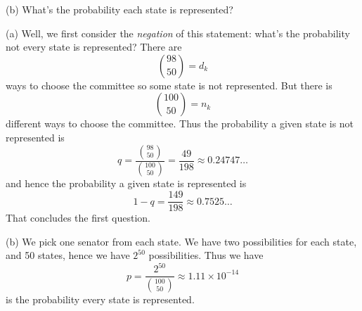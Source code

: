 (b) What's the probability each state is represented?

(a) Well, we first consider the \emph{negation} of this statement: what's
the probability not every state is represented? There are
\begin{equation}
{98\choose 50} = d_{k}
\end{equation}
ways to choose the committee so some state is not represented. But there
is 
\begin{equation}
{100\choose 50}=n_{k}
\end{equation}
different ways to choose the committee. Thus the probability a given state is
not represented is
\begin{equation}
q = \frac{{98\choose50}}{{100\choose50}} = \frac{49}{198}\approx 0.24747\dots
\end{equation}
and hence the probability a given state is represented is
\begin{equation}
1-q = \frac{149}{198} \approx 0.7525\dots
\end{equation}
That concludes the first question.

(b)
We pick one senator from each state. We have two possibilities for each
state, and 50 states, hence we have $2^{50}$ possibilities. Thus we have
\begin{equation}
p = \frac{2^{50}}{{100\choose 50}} \approx 1.11\times10^{-14}
\end{equation}
is the probability every state is represented.
